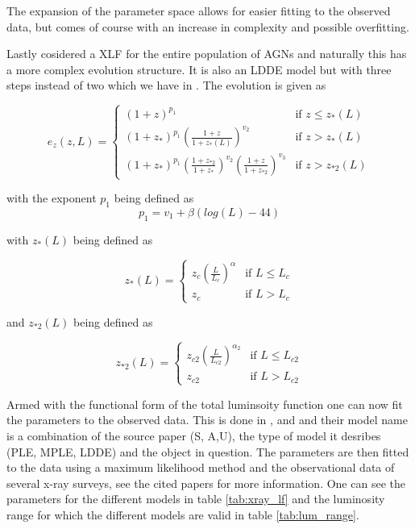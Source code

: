 \documentclass{article}
\begin{document}
 The expansion of the parameter space allows for easier fitting to the observed data, but comes of course with an increase in complexity and possible overfitting. 

 Lastly \cite{Ueda_2014} cosidered a XLF for the entire population of AGNs and naturally this has a more complex evolution structure. It is also an LDDE model but with three steps instead of two which we have in \cite{Ueda_2003}.
The evolution is given as

 
\begin{equation}
e_z(z, L) = 
\begin{cases} 
(1 + z)^{p_1} & \text{if } z \leq z_*(L) \\
(1 + z_{*})^{p_1} \left( \frac{1 + z}{1 + z_*(L)} \right)^{v_2} & \text{if } z >  z_*(L)\\
(1 + z_{*})^{p_1} (\frac{1 + z_{*2}}{1+ z_{*}})^{v_2} (\frac{1+z}{1+z_{*2}})^{v_3} & \text{if } z >  z_{*2}(L)

\end{cases}
\end{equation}

with the exponent $p_1$ being defined as
\begin{equation}
    p_1 = v_1 + \beta(log(L)-44)
\end{equation}

with $z_{*}(L)$ being defined as

\begin{equation}
z_*(L) = 
\begin{cases} 
z_c \left( \frac{L}{L_c} \right)^\alpha & \text{if } L \leq L_c \\
z_c & \text{if } L > L_c 
\end{cases}
\end{equation}


and $z_{*2}(L)$ being defined as

\begin{equation}
z_{*2}(L) =
\begin{cases}
z_{c2} \left( \frac{L}{L_{c2}} \right)^{\alpha_2} & \text{if } L \leq L_{c2} \\
z_{c2} & \text{if } L > L_{c2}
\end{cases}
\end{equation}



Armed with the functional form of the total luminsoity function one can now fit the parameters to the observed data. This is done in \cite{Silverman_2008}, \cite{Ajello_2009} and \cite{Ueda_2014} and their 
model name is a combination of the source paper (S, A,U), the type of model it desribes (PLE, MPLE, LDDE) and the object in question. The parameters are then fitted to the data using a maximum likelihood method and the observational data of several x-ray surveys, see the cited papers for more information.
One can see the parameters for the different models in table \ref{tab:xray_lf} and the luminosity range for which the different models are valid in table \ref{tab:lum_range}.
\end{document}

